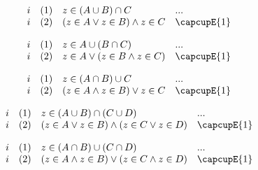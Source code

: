 \documentclass{book}
\theoremstyle{plain}
\theoremstyle{remark}
\theoremstyle{definition}
\begin{document}
\[
\begin{array}{llll}
	i & (1) & z\in (A \cup B)\cap C & ... \\
	i & (2) &  (z \in A \lor z \in B)\land z\in C & \capcupE{1} \\
\end{array}
\]

\[
\begin{array}{llll}
	i & (1) & z \in A \cup (B \cap C) & ... \\
	i & (2) & z \in A \lor (z \in B \land z \in C) & \capcupE{1} \\
	
\end{array}
\]

\[
\begin{array}{llll}
	i & (1) & z\in (A \cap B)\cup C & ... \\
	i & (2) &  (z \in A \land z \in B)\lor z\in C & \capcupE{1} \\
\end{array}
\]

\[
\begin{array}{llll}
	i & (1) & z \in (A \cup B) \cap (C \cup D) & ... \\
	i & (2) & (z \in A \lor z \in B) \land (z \in C \lor z \in D) & \capcupE{1} \\
\end{array}
\]

\[
\begin{array}{llll}
	i & (1) & z \in (A \cap B) \cup (C \cap D) & ... \\
	i & (2) & (z \in A \land z \in B) \lor (z \in C \land z \in D) & \capcupE{1} \\
\end{array}
\]
\end{document}
